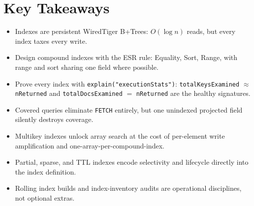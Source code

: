 \section*{Key Takeaways}
\begin{itemize}
    \item Indexes are persistent WiredTiger B+Trees: $O(\log n)$ reads, but every index taxes every write.
    \item Design compound indexes with the ESR rule: Equality, Sort, Range, with range and sort sharing one field where possible.
    \item Prove every index with \texttt{explain("executionStats")}: \texttt{totalKeysExamined} $\approx$ \texttt{nReturned} and \texttt{totalDocsExamined} $=$ \texttt{nReturned} are the healthy signatures.
    \item Covered queries eliminate \texttt{FETCH} entirely, but one unindexed projected field silently destroys coverage.
    \item Multikey indexes unlock array search at the cost of per-element write amplification and one-array-per-compound-index.
    \item Partial, sparse, and TTL indexes encode selectivity and lifecycle directly into the index definition.
    \item Rolling index builds and index-inventory audits are operational disciplines, not optional extras.
\end{itemize}

